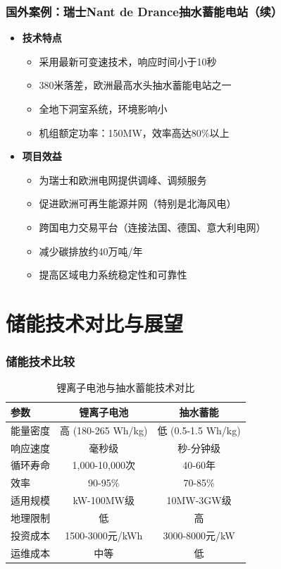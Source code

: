 \documentclass[aspectratio=169]{beamer}
\begin{document}
\begin{frame}
    \frametitle{国外案例：瑞士Nant de Drance抽水蓄能电站（续）}
    \begin{itemize}
        \item \textbf{技术特点}
        \begin{itemize}
            \item 采用最新可变速技术，响应时间小于10秒
            \item 380米落差，欧洲最高水头抽水蓄能电站之一
            \item 全地下洞室系统，环境影响小
            \item 机组额定功率：150MW，效率高达80\%以上
        \end{itemize}
        
        \item \textbf{项目效益}
        \begin{itemize}
            \item 为瑞士和欧洲电网提供调峰、调频服务
            \item 促进欧洲可再生能源并网（特别是北海风电）
            \item 跨国电力交易平台（连接法国、德国、意大利电网）
            \item 减少碳排放约40万吨/年
            \item 提高区域电力系统稳定性和可靠性
        \end{itemize}
    \end{itemize}
\end{frame}

\section{储能技术对比与展望}

\begin{frame}
    \frametitle{储能技术比较}
    \begin{table}
        \centering
        \begin{tabular}{lcc}
            \toprule
            \textbf{参数} & \textbf{锂离子电池} & \textbf{抽水蓄能} \\
            \midrule
            能量密度 & 高 (180-265 Wh/kg) & 低 (0.5-1.5 Wh/kg) \\
            响应速度 & 毫秒级 & 秒-分钟级 \\
            循环寿命 & 1,000-10,000次 & 40-60年 \\
            效率 & 90-95\% & 70-85\% \\
            适用规模 & kW-100MW级 & 10MW-3GW级 \\
            地理限制 & 低 & 高 \\
            投资成本 & 1500-3000元/kWh & 3000-8000元/kW \\
            运维成本 & 中等 & 低 \\
            \bottomrule
        \end{tabular}
        \caption{锂离子电池与抽水蓄能技术对比}
    \end{table}
\end{frame}
\end{document}
